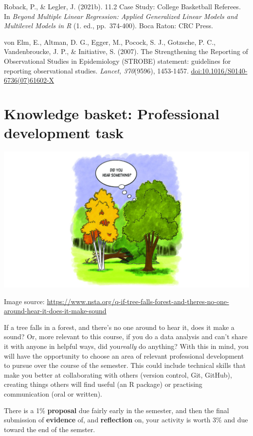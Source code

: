 \documentclass[
  openany]{book}
\begin{document}
Roback, P., \& Legler, J. (2021b). 11.2 Case Study: College Basketball Referees. In \emph{Beyond Multiple Linear Regression: Applied Generalized Linear Models and Multilevel Models in R} (1. ed., pp.~374-400). Boca Raton: CRC Press.

von Elm, E., Altman, D. G., Egger, M., Pocock, S. J., Gotzsche, P. C., Vandenbroucke, J. P., \& Initiative, S. (2007). The Strengthening the Reporting of Observational Studies in Epidemiology (STROBE) statement: guidelines for reporting observational studies. \emph{Lancet, 370}(9596), 1453-1457. \url{doi:10.1016/S0140-6736(07)61602-X}

\hypertarget{knowledge-basket-professional-development-task}{%
\chapter{Knowledge basket: Professional development task}\label{knowledge-basket-professional-development-task}}

\begin{center}\includegraphics[width=0.5\linewidth]{images/assessments/tree-sounds} \end{center}

Image source: \url{https://www.nsta.org/q-if-tree-falls-forest-and-theres-no-one-around-hear-it-does-it-make-sound}

If a tree falls in a forest, and there's no one around to hear it, does it make a sound? Or, more relevant to this course, if you do a data analysis and can't share it with anyone in helpful ways, did you\emph{really} do anything? With this in mind, you will have the opportunity to choose an area of relevant professional development to pursue over the course of the semester. This could include technical skills that make you better at collaborating with others (version control, Git, GitHub), creating things others will find useful (an R package) or practising communication (oral or written).

There is a 1\% \textbf{proposal} due fairly early in the semester, and then the final submission of \textbf{evidence} of, and \textbf{reflection} on, your activity is worth 3\% and due toward the end of the semster.
\end{document}
